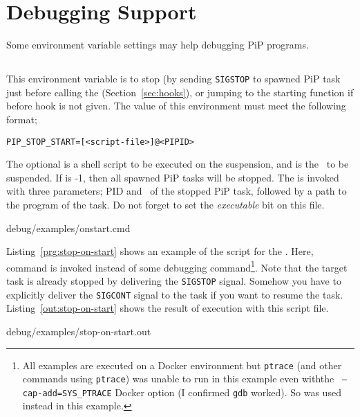 
\section{Debugging Support}

Some environment variable settings may help debugging PiP programs.

\subsection{}

This environment variable is to stop (by sending {\tt SIGSTOP} to
spawned PiP task just before calling the 
(Section~\ref{sec:hooks}), or jumping to the starting function if
before hook is not given. The value of this environment must meet the
following format;  

\begin{lstlisting}[frame=tb]
  PIP_STOP_START=[<script-file>]@<PIPID>
\end{lstlisting}

The optional {\tt{}} is a shell
script to be executed on the suspension, and {\tt{}} is the
\PIPID\ to be suspended. If {\tt{}} is -1, then all spawned PiP
tasks will be stopped. The {\tt{}} is invoked with
three parameters; PID and \PIPID\ of the stopped PiP task, followed by a
path to the program of the task. Do not forget to set the {\it
  executable} bit on this {\tt{}} file.

 {debug/examples/onstart.cmd}

Listing~\ref{prg:stop-on-start} shows an example of the script for the
. Here,  command is invoked
instead of some debugging command\footnote{All examples are executed
on a Docker environment but {\tt ptrace} (and other commands using
{\tt ptrace}) was unable to run in this example even withthe {\tt
  --cap-add=SYS_PTRACE} Docker option (I confirmed {\tt gdb} worked). So 
 was used instead in this example.}. Note that 
the target task is already stopped by delivering the {\tt SIGSTOP}
signal. Somehow you have to explicitly deliver the {\tt SIGCONT}
signal to the task if you want to resume the
task. Listing~\ref{out:stop-on-start} shows the result of 
 execution with this script file. 

 {debug/examples/stop-on-start.out}

